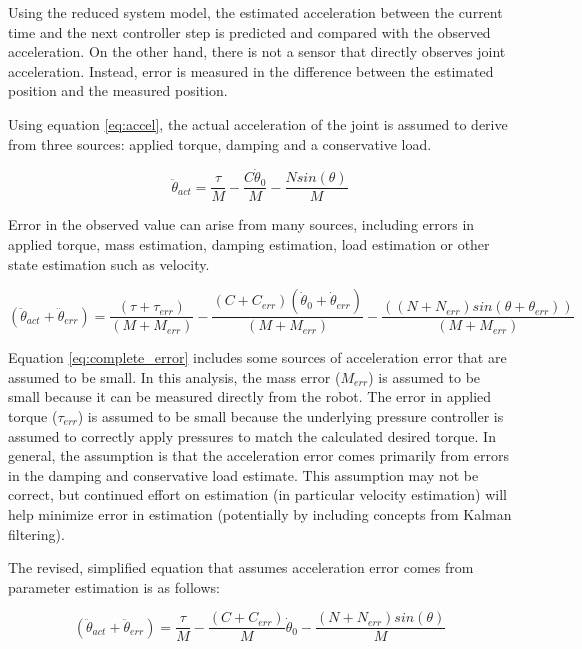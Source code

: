 Using the reduced system model, the estimated acceleration between the current time and the next controller 
step is predicted and compared with the observed acceleration. On the other hand,
there is not a sensor that directly observes joint acceleration. Instead, error
is measured in the difference between the estimated position and the measured 
position.


Using equation \ref{eq:accel}, the actual acceleration of the joint is assumed to derive from three sources: applied torque, damping and a conservative load.

\begin{equation}
\ddot{\theta}_{act} = \dfrac{\tau}{M} - \dfrac{C \dot{\theta}_{0}}{M} - \dfrac{N sin(\theta)}{M}
\end{equation}

Error in the observed value can arise from many sources, including errors in applied torque, mass estimation, damping estimation, load estimation or other state estimation such as velocity.

\begin{equation} \label{eq:complete_error}
(\ddot{\theta}_{act} + \ddot{\theta}_{err}) = \dfrac{(\tau + \tau_{err})}{(M + M_{err})} - \dfrac{(C + C_{err}) (\dot{\theta}_{0} + \dot{\theta}_{err})}{(M + M_{err})} - \dfrac{((N + N_{err})sin(\theta + \theta_{err}))}{(M + M_{err})}
\end{equation}

Equation \ref{eq:complete_error} includes some sources of acceleration error that are assumed to be small. In 
this analysis, the mass error ($M_{err}$) is assumed to be small because it can
be measured directly from the robot. The error in applied torque ($\tau_{err}$) is assumed to be small because
the underlying pressure controller is assumed to correctly apply pressures to
match the calculated desired torque. In general, the assumption is that the acceleration error
comes primarily from errors in the damping and conservative load estimate. This 
assumption may not be correct, but continued effort on estimation (in particular 
velocity estimation) will help minimize error in estimation (potentially by 
including concepts from Kalman filtering).

The revised, simplified equation that assumes acceleration error comes from parameter estimation is as follows:

\begin{equation}
(\ddot{\theta}_{act} + \ddot{\theta}_{err}) = \dfrac{\tau}{M} - \dfrac{(C + C_{err})}{M}\dot{\theta}_{0} - \dfrac{(N + N_{err})sin(\theta)}{M}
\end{equation}

